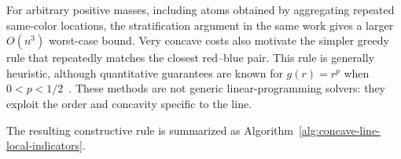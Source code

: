 For arbitrary positive masses, including atoms obtained by aggregating repeated same-color locations, the stratification argument in the same work gives a larger $O(n^3)$ worst-case bound. Very concave costs also motivate the simpler greedy rule that repeatedly matches the closest red--blue pair. This rule is generally heuristic, although quantitative guarantees are known for $g(r)=r^p$ when $0<p<1/2$~\cite{OttoliniSteinerberger2023GreedyConcave}. These methods are not generic linear-programming solvers: they exploit the order and concavity specific to the line.

The resulting constructive rule is summarized as Algorithm~\ref{alg:concave-line-local-indicators}.

